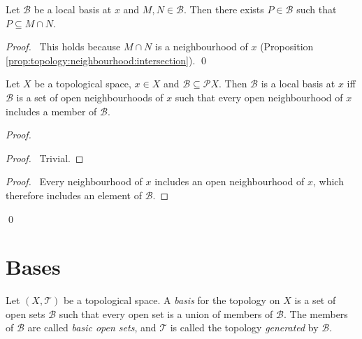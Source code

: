 \begin{prop}
  Let $\mathcal{B}$ be a local basis at $x$ and $M, N \in \mathcal{B}$. Then
  there exists $P \in \mathcal{B}$ such that $P \subseteq M \cap N$.
\end{prop}

\begin{proof}
  \pf\ This holds because $M \cap N$ is a neighbourhood of $x$ (Proposition
  \ref{prop:topology:neighbourhood:intersection}). \qed
\end{proof}

\begin{prop}
  \label{prop:topology:local_basis:characterisation}
  Let $X$ be a topological space, $x \in X$ and $\mathcal{B} \subseteq
  \mathcal{P} X$. Then $\mathcal{B}$ is a local basis at $x$ iff
  $\mathcal{B}$ is a set of open neighbourhoods of $x$ such that every open
  neighbourhood of $x$ includes a member of $\mathcal{B}$.
\end{prop}

\begin{proof}
  \pf
  \begin{proof}
    \pf\ Trivial.
  \end{proof}
  \begin{proof}
    \pf\ Every neighbourhood of $x$ includes an open neighbourhood of $x$,
    which therefore includes an element of $\mathcal{B}$.
  \end{proof}
  \qed
\end{proof}

\section{Bases}

\begin{df}
  Let $(X, \mathcal{T})$ be a topological space. A \emph{basis} for the
  topology on $X$ is a
  set of open sets $\mathcal{B}$ such that every open set is a union of
  members of $\mathcal{B}$. The members of $\mathcal{B}$ are called
  \emph{basic open sets}, and $\mathcal{T}$ is called the topology
  \emph{generated} by $\mathcal{B}$.
\end{df}

